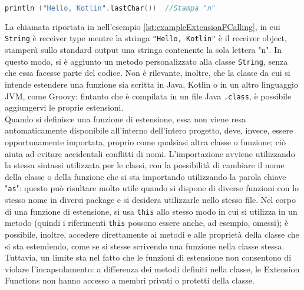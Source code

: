 \begin{lstlisting}[caption={Chiamata di una Extension Function}, captionpos=b, label={lst:exampleExtensionFCalling}, language=Kotlin]
println ("Hello, Kotlin".lastChar())  //Stampa "n"
\end{lstlisting}

La chiamata riportata in nell'esempio \ref{lst:exampleExtensionFCalling}, in cui \texttt{String} è receiver type mentre la stringa \texttt{"Hello, Kotlin"} è il receiver object, stamperà sullo standard output una stringa contenente la sola lettera "n". In questo modo, si è aggiunto un metodo personalizzato alla classe \texttt{String}, senza che essa facesse parte del codice. Non è rilevante, inoltre, che la classe da cui si intende estendere una funzione sia scritta in Java, Kotlin o in un altro linguaggio JVM, come Groovy: fintanto che è compilata in un file Java \texttt{.class}, è possibile aggiungervi le proprie estensioni.\\
Quando si definisce una funzione di estensione, essa non viene resa automaticamente disponibile all'interno dell'intero progetto, deve, invece, essere opportunamente importata, proprio come qualsiasi altra classe o funzione; ciò aiuta ad evitare accidentali conflitti di nomi. L’importazione avviene utilizzando la stessa sintassi utilizzata per le classi, con la possibilità di cambiare il nome della classe o della funzione che si sta importando utilizzando la parola chiave "\texttt{as}": questo può risultare molto utile quando si dispone di diverse funzioni con lo stesso nome in diversi package e si desidera utilizzarle nello stesso file.
Nel corpo di una funzione di estensione, si usa \texttt{this} allo stesso modo in cui si utilizza in un metodo (quindi i riferimenti \texttt{this} possono essere anche, ad esempio, omessi); è possibile, inoltre, accedere direttamente ai metodi e alle proprietà della classe che si sta estendendo, come se si stesse scrivendo una funzione nella classe stessa. Tuttavia, un limite sta nel fatto che le funzioni di estensione non consentono di violare l'incapsulamento: a differenza dei metodi definiti nella classe, le Extension Functions non hanno accesso a membri privati o protetti della classe.\\

